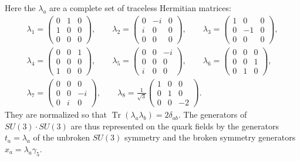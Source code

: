Here the $\lambda_a$ are a complete set of traceless Hermitian matrices:
\begin{equation}
\begin{gathered}
\lambda_1=\begin{pmatrix}0&1&0\\1&0&0\\0&0&0\end{pmatrix},
\qquad
\lambda_2=\begin{pmatrix}0&-i&0\\i&0&0\\0&0&0\end{pmatrix},
\qquad
\lambda_3=\begin{pmatrix}1&0&0\\0&-1&0\\0&0&0\end{pmatrix},
\\[6pt]
\lambda_4=\begin{pmatrix}0&0&1\\0&0&0\\1&0&0\end{pmatrix},
\qquad
\lambda_5=\begin{pmatrix}0&0&-i\\0&0&0\\i&0&0\end{pmatrix},
\qquad
\lambda_6=\begin{pmatrix}0&0&0\\0&0&1\\0&1&0\end{pmatrix},
\\[6pt]
\lambda_7=\begin{pmatrix}0&0&0\\0&0&-i\\0&i&0\end{pmatrix},
\qquad
\lambda_8=\frac{1}{\sqrt3}
\begin{pmatrix}1&0&0\\0&1&0\\0&0&-2\end{pmatrix}.
\end{gathered}
\tag{19.7.2}\label{eq:19.7.2}
\end{equation}
They are normalized so that $\operatorname{Tr}(\lambda_a\lambda_b)=2\delta_{ab}$. The generators of $SU(3)\cdot SU(3)$ are thus represented on the quark fields by the generators $t_a=\lambda_a$ of the unbroken $SU(3)$ symmetry and the broken symmetry generators $x_a=\lambda_a\gamma_5$.

